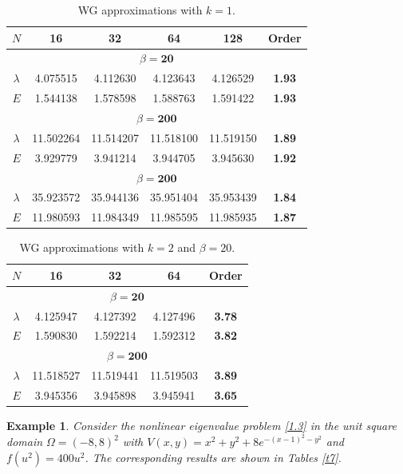 \documentclass[compress, preprint,9pt]{elsarticle}
\numberwithin{equation}{section}
\newtheorem{example}{Example}[section]
\begin{document}
\begin{table}[ht]
	\centering
	\caption{WG approximations with $k=1$.}
	\label{t5}
	\begin{tabular}{|c|c|c|c|c|c|}\hline
		$N$&16&32&64&128&Order\\ \hline\hline
		\multicolumn{6}{|c|}{$\beta=\textbf{20}$}\\ \hline
		$\lambda$& 4.075515 & 4.112630 & 4.123643 & 4.126529 & \textbf{1.93} 
		\\ \hline
		$E$&1.544138 & 1.578598 & 1.588763 & 1.591422 & \textbf{1.93}
		\\ \hline
		\multicolumn{6}{|c|}{$\beta=\textbf{200}$}\\ \hline
		$\lambda$& 11.502264 & 11.514207 & 11.518100 & 11.519150 & \textbf{1.89} 
		\\ \hline
		$E$&3.929779 & 3.941214 & 3.944705 & 3.945630 & \textbf{1.92} 
		\\ \hline
		\multicolumn{6}{|c|}{$\beta=\textbf{200}$}\\ \hline
		$\lambda$& 35.923572 & 35.944136 & 35.951404 & 35.953439 & \textbf{1.84} 
		\\ \hline
		$E$&11.980593 & 11.984349 & 11.985595 & 11.985935 & \textbf{1.87} 
		\\ \hline
	\end{tabular}
\end{table}
\begin{table}[ht]
	\centering
	\caption{WG approximations with $k=2$ and $\beta=20$.}
	\label{t6}
	\begin{tabular}{|c|c|c|c|c|}\hline
		$N$&16&32&64&Order\\ \hline\hline
		\multicolumn{5}{|c|}{$\beta=\textbf{20}$}\\ \hline
		$\lambda$& 4.125947 & 4.127392 & 4.127496 & \textbf{3.78} 
		\\ \hline
		$E$& 1.590830 & 1.592214 & 1.592312 & \textbf{3.82} 
		\\ \hline
		\multicolumn{5}{|c|}{$\beta=\textbf{200}$}\\ \hline
		$\lambda$& 11.518527 & 11.519441 & 11.519503 & \textbf{3.89} 
		\\ \hline
		$E$&3.945356 & 3.945898 & 3.945941 & \textbf{3.65} 
		\\ \hline
	\end{tabular}
\end{table}

\begin{example}
	Consider the nonlinear eigenvalue problem \eqref{1.3} in the unit square domain $\Omega=(-8,8)^2$ with $V(x,y)=x^2+y^2+8e^{-(x-1)^2-y^2}$ and $f(u^2)=400 u^2$. The corresponding results are shown in Tables \ref{t7}.
\end{example}
\end{document}
